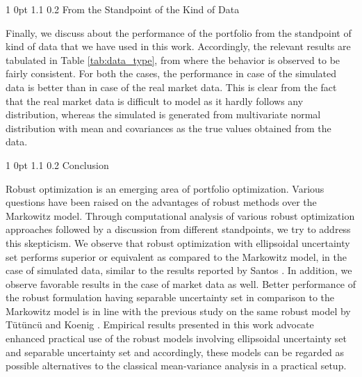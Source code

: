 \documentclass[12pt]{article}
\makeatletter
\numberwithin{equation}{section}
\renewcommand{\section}{
  \@startsection
  {section}%
  {1}%
  {0pt}%
  {1.1\baselineskip}%
  {0.2\baselineskip}%
  {\sc \centering}%
}
\renewcommand{\subsection}{
  \@startsection
  {subsection}%
  {1}%
  {0pt}%
  {1.1\baselineskip}%
  {0.2\baselineskip}%
  {\sc \centering}%
}
\makeatother
\begin{document}
\subsection{From the Standpoint of the Kind of Data}

Finally, we discuss about the performance of the portfolio from the standpoint of kind of data that we have used in this work. Accordingly, the relevant results are tabulated in Table \ref{tab:data_type}, from where the behavior is observed to be fairly consistent. For both the cases, the performance in case of the simulated data is better than in case of the real market data. This is clear from the fact that the real market data is difficult to model as it hardly follows any distribution, whereas the simulated is generated from multivariate normal distribution with mean and covariances as the true values obtained from the data.

\section{Conclusion}
\label{Conclusion}

Robust optimization is an emerging area of portfolio optimization. Various questions have been raised on the advantages of robust methods over the Markowitz model. Through computational analysis of various robust optimization approaches followed by a discussion from different standpoints, we try to address this skepticism. We observe that robust optimization with ellipsoidal uncertainty set performs superior or equivalent as compared to the Markowitz model, in the case of simulated data, similar to the results reported by Santos \cite{Santos10}. In addition, we observe favorable results in the case of market data as well. Better performance of the robust formulation having separable uncertainty set in comparison to the Markowitz model is in line with the previous study on the same robust model by T{\"u}t{\"u}nc{\"u} and Koenig \cite{Tutuncu04}. Empirical results presented in this work advocate enhanced practical use of the robust models involving ellipsoidal uncertainty set and separable uncertainty set and accordingly, these models can be regarded as possible alternatives to the classical mean-variance analysis in a practical setup.
\end{document}
